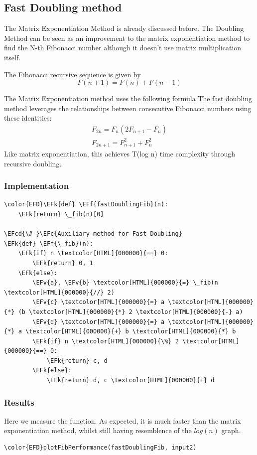\documentclass[a4paper,12pt]{article}
\newcommand{\EFc}[1]{\textcolor{EFc}{#1}} %
\newcommand{\EFcd}[1]{\textcolor{EFcd}{#1}} %
\newcommand{\EFk}[1]{\textcolor{EFk}{#1}} %
\newcommand{\EFf}[1]{\textcolor{EFf}{#1}} %
\newcommand{\EFv}[1]{\textcolor{EFv}{#1}} %
\begin{document}
\subsection{Fast Doubling method}
\label{sec:orgabf6b06}
The Matrix Exponentiation Method is already discussed before. The Doubling Method can be seen as an improvement to the matrix exponentiation method to find the N-th Fibonacci number although it doesn’t use matrix multiplication itself.

The Fibonacci recursive sequence is given by 
\[
F(n+1) = F(n) + F(n-1)
\]

The Matrix Exponentiation method uses the following formula
The fast doubling method leverages the relationships between consecutive Fibonacci numbers using these identities:
\begin{align}
\label{eq:4}
F_{2n} = F_n(2F_{n+1} - F_n) \\
F_{2n+1} = F_{n+1}^2 + F_n^2
\end{align}
Like matrix exponentiation, this achieves T(log n) time complexity through recursive doubling.
\subsubsection{Implementation}
\label{sec:orga789a1e}
\begin{Code}
\begin{Verbatim}
\color{EFD}\EFk{def} \EFf{fastDoublingFib}(n):
    \EFk{return} \_fib(n)[0]

\EFcd{\# }\EFc{Auxiliary method for Fast Doubling}
\EFk{def} \EFf{\_fib}(n):
    \EFk{if} n \textcolor[HTML]{000000}{==} 0:
        \EFk{return} 0, 1
    \EFk{else}:
        \EFv{a}, \EFv{b} \textcolor[HTML]{000000}{=} \_fib(n \textcolor[HTML]{000000}{//} 2)
        \EFv{c} \textcolor[HTML]{000000}{=} a \textcolor[HTML]{000000}{*} (b \textcolor[HTML]{000000}{*} 2 \textcolor[HTML]{000000}{-} a)
        \EFv{d} \textcolor[HTML]{000000}{=} a \textcolor[HTML]{000000}{*} a \textcolor[HTML]{000000}{+} b \textcolor[HTML]{000000}{*} b
        \EFk{if} n \textcolor[HTML]{000000}{\%} 2 \textcolor[HTML]{000000}{==} 0:
            \EFk{return} c, d
        \EFk{else}:
            \EFk{return} d, c \textcolor[HTML]{000000}{+} d
\end{Verbatim}
\end{Code}
\subsubsection{Results}
\label{sec:org3e2166f}
Here we measure the function. As expected, it is much faster than the matrix exponentiation method, whilst still having resemblence of the \(log(n)\) graph.
\begin{Code}
\begin{Verbatim}
\color{EFD}plotFibPerformance(fastDoublingFib, input2)
\end{Verbatim}
\end{Code}
\end{document}
